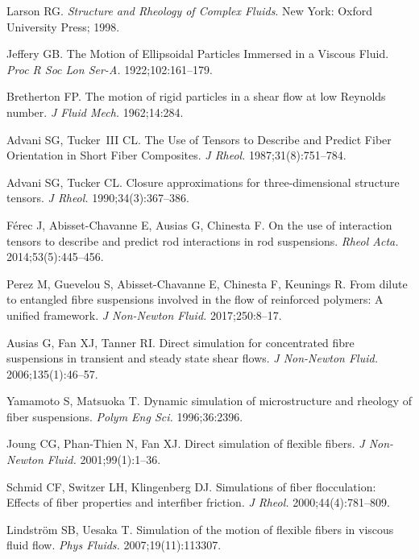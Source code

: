 \documentclass[AMA,STIX1COL]{WileyNJD-v2}
\begin{document}
\begin{thebibliography}{10}

Larson RG. {\it {Structure and Rheology of Complex Fluids}}.
\newblock New York: Oxford University Press; 1998.

Jeffery GB. {The Motion of Ellipsoidal Particles Immersed in a Viscous Fluid}.
  {\it Proc R Soc Lon Ser-A. }1922;102:161--179.

Bretherton FP. {The motion of rigid particles in a shear flow at low Reynolds
  number}.  {\it J Fluid Mech. }1962;14:284.

Advani SG, Tucker~III CL. {The Use of Tensors to Describe and Predict Fiber
  Orientation in Short Fiber Composites}.  {\it J Rheol. }1987;31(8):751--784.

Advani SG, Tucker CL. Closure approximations for three-dimensional structure
  tensors.  {\it J Rheol. }1990;34(3):367--386.

F{\'e}rec J, Abisset-Chavanne E, Ausias G, Chinesta F. On the use of
  interaction tensors to describe and predict rod interactions in rod
  suspensions.  {\it Rheol Acta. }2014;53(5):445--456.

Perez M, Guevelou S, Abisset-Chavanne E, Chinesta F, Keunings R. {From dilute
  to entangled fibre suspensions involved in the flow of reinforced polymers: A
  unified framework}.  {\it J Non-Newton Fluid. }2017;250:8--17.

Ausias G, Fan XJ, Tanner RI. Direct simulation for concentrated fibre
  suspensions in transient and steady state shear flows.  {\it J Non-Newton
  Fluid. }2006;135(1):46--57.

Yamamoto S, Matsuoka T. Dynamic simulation of microstructure and rheology of
  fiber suspensions.  {\it Polym Eng Sci. }1996;36:2396.

Joung CG, Phan-Thien N, Fan XJ. Direct simulation of flexible fibers.  {\it J
  Non-Newton Fluid. }2001;99(1):1--36.

Schmid CF, Switzer LH, Klingenberg DJ. {Simulations of fiber flocculation:
  Effects of fiber properties and interfiber friction}.  {\it J Rheol.
  }2000;44(4):781--809.

Lindstr{\"o}m SB, Uesaka T. Simulation of the motion of flexible fibers in
  viscous fluid flow.  {\it Phys Fluids. }2007;19(11):113307.


\end{thebibliography}
\end{document}
